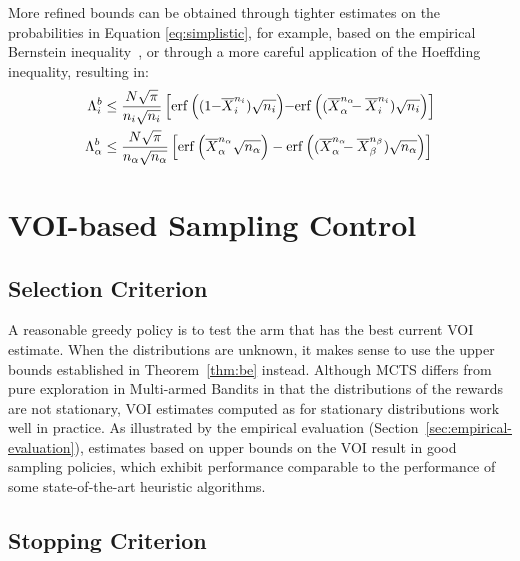 \documentclass[]{article}
\begin{document}
More refined bounds can be obtained through tighter estimates on the
probabilities in Equation \ref{eq:simplistic}, for example, based on the empirical Bernstein
inequality~\cite{MaurerPontil.benrstein}, or through a more careful
application of the Hoeffding inequality, resulting in:
\begin{align}
\Lambda_i^b&\le\frac {N\sqrt \pi} {n_i \sqrt {n_i}}
  \left[\mathrm{erf}\left((1\hspace{-0.25em}-\hspace{-0.25em}\overline X_i^{n_i})\sqrt {n_i}\right)
      \hspace{-0.25em}-\hspace{-0.25em}\mathrm{erf}\left((\overline X_\alpha^{n_\alpha}\hspace{-0.5em} - \overline X_i^{n_i})\sqrt{n_i}\right)\right]\nonumber\\
\Lambda_\alpha^b&\le\frac {N\sqrt \pi} {n_\alpha \sqrt {n_\alpha}}
  \left[\mathrm{erf}\left(\overline X_\alpha^{n_\alpha}\sqrt {n_\alpha}\right)
      -\mathrm{erf}\left((\overline X_\alpha^{n_\alpha}\hspace{-0.5em} - \overline X_\beta^{n_\beta})\sqrt{n_\alpha}\right)\right]
\label{eqn:erf-blinkered}
\end{align}

\section{VOI-based Sampling Control}

\subsection{Selection Criterion}

A reasonable greedy policy is to test the arm that has the best
current VOI estimate. When the distributions are unknown, it makes sense
to use the upper bounds established in Theorem~\ref{thm:be} instead. Although MCTS
differs from pure exploration in Multi-armed Bandits in that the
distributions of the rewards are not stationary, VOI
estimates computed as for stationary distributions work well in
practice. As illustrated
by the empirical evaluation (Section~\ref{sec:empirical-evaluation}),
estimates based on upper bounds on the VOI result in good sampling
policies, which exhibit performance comparable to the performance of
some state-of-the-art heuristic algorithms.

\subsection{Stopping Criterion}
\label{sec:control-stopping-criterion}
\end{document}

